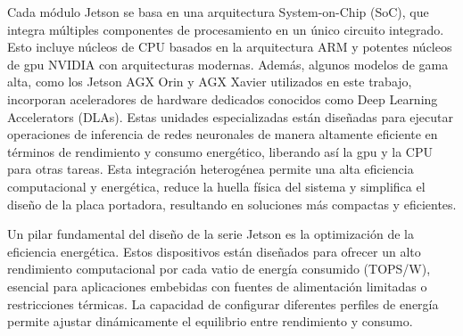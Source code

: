 \documentclass[11pt,spanish,listoffigures,listoftables]{tfgetsinf}
\begin{document}
Cada módulo Jetson se basa en una arquitectura System-on-Chip (SoC), que integra múltiples componentes de procesamiento en un único circuito integrado. Esto incluye núcleos de CPU basados en la arquitectura ARM y potentes núcleos de \gls{gpu} NVIDIA con arquitecturas modernas. Además, algunos modelos de gama alta, como los Jetson AGX Orin y AGX Xavier utilizados en este trabajo, incorporan aceleradores de hardware dedicados conocidos como Deep Learning Accelerators (DLAs). Estas unidades especializadas están diseñadas para ejecutar operaciones de inferencia de redes neuronales de manera altamente eficiente en términos de rendimiento y consumo energético, liberando así la \gls{gpu} y la CPU para otras tareas. Esta integración heterogénea permite una alta eficiencia computacional y energética, reduce la huella física del sistema y simplifica el diseño de la placa portadora, resultando en soluciones más compactas y eficientes.

Un pilar fundamental del diseño de la serie Jetson es la optimización de la eficiencia energética. Estos dispositivos están diseñados para ofrecer un alto rendimiento computacional por cada vatio de energía consumido (TOPS/W), esencial para aplicaciones embebidas con fuentes de alimentación limitadas o restricciones térmicas. La capacidad de configurar diferentes perfiles de energía permite ajustar dinámicamente el equilibrio entre rendimiento y consumo.

\begin{table}[H]
   \centering
   \caption[Comparativa técnica entre diferentes modelos NVIDIA Jetson]{Comparativa técnica entre diferentes modelos NVIDIA Jetson.}
   \label{tab:jetson_comparison}
\end{table}
\end{document}
